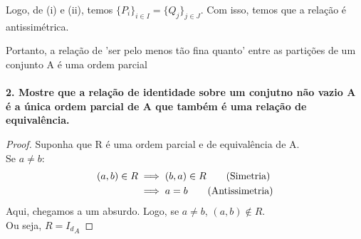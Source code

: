 Logo, de (i) e (ii), temos $\{P_i\}_{i \in I} = \{Q_j\}_{j \in J}$. Com isso, temos que a relação é antissimétrica.

Portanto, a  relação de 'ser pelo menos tão fina quanto' entre as partições de um conjunto A é uma ordem parcial\\\\

\textbf{2. Mostre que a relação de identidade sobre um conjutno não vazio A é a única ordem parcial de A que também é uma relação de equivalência.}

\begin{proof}
Suponha que R é uma ordem parcial e de equivalência de A.\\
Se $a \neq b$:
\begin{align*}
    (a, b) \in R 
    &\implies (b, a) \in R \tag*{\text{(Simetria)}}\\
    &\implies a = b \tag*{\text{(Antissimetria)}}
\end{align*}
Aqui, chegamos a um absurdo. Logo, se $ a \neq b$, $(a,b) \notin R$.\\ Ou seja, $R = {I_d}_A$ 
\end{proof}